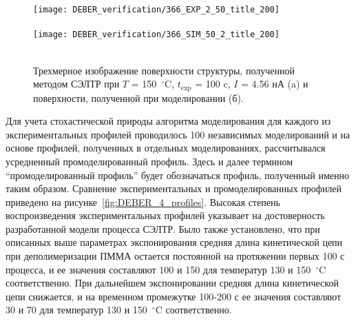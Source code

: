 \begin{figure}[h!]
	\begin{center}
		\texttt{[image: DEBER\_verification/366\_EXP\_2\_50\_title\_200]} \\
		\vspace{-10.7em}  \vspace{9.7em} \\
		\vspace{-1em}
		\texttt{[image: DEBER\_verification/366\_SIM\_50\_2\_title\_200]} \\
		\vspace{-10.7em}  \vspace{10.7em} \\
	\end{center}
	\vspace{-2em}
	\caption{Трехмерное изображение поверхности структуры, полученной методом СЭЛТР при $T$ = 150~$^\circ$C, $t_\mathrm{exp}$ = 100 c, $I$ = 4.56 нА (a) и поверхности, полученной при моделировании (б).}
	\label{fig:DEBER_3D_sim}
\end{figure}

Для учета стохастической природы алгоритма моделирования для каждого из экспериментальных профилей проводилось 100 независимых моделирований и на основе профилей, полученных в отдельных моделированиях, рассчитывался усредненный промоделированный профиль.
Здесь и далее термином ``промоделированный профиль'' будет обозначаться профиль, полученный именно таким образом.
Сравнение экспериментальных и промоделированных профилей приведено на рисунке~\ref{fig:DEBER_4_profiles}.
Высокая степень воспроизведения экспериментальных профилей указывает на достоверность разработанной модели процесса СЭЛТР.
Было также установлено, что при описанных выше параметрах экспонирования средняя длина кинетической цепи при деполимеризации ПММА остается постоянной на протяжении первых 100 с процесса, и ее значения составляют 100 и 150 для температур 130 и 150~$^\circ$C соответственно.
При дальнейшем экспонировании средняя длина кинетической цепи снижается, и на временном промежутке 100-200 с ее значения составляют 30 и 70 для температур 130 и 150~$^\circ$C соответственно.

